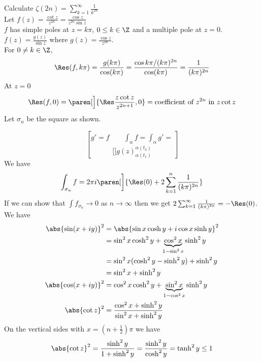 Calculate $\zeta(2n)=\sum_{k=1}^\infty\frac{1}{k^{2n}}$ \\
\soln Let $f(z)=\frac{\cot z}{z^{2n}}=\frac{\cos z}{z^{2n}\sin z}$ \\
$f$ has simple poles at $z=k\pi$, $0\leq k\in\Z$ and a multiple pole at $z=0$. \\
$f(z)=\frac{g(z)}{\sin z}$ where $g(z)=\frac{\cos z}{z^{2n}}$. \\
For $0\neq k\in\Z$,
\[ \Res(f,k\pi) = \frac{g(k\pi)}{\cos(k\pi)} = \frac{\cos k\pi/(k\pi)^{2n}}{\cos(k\pi)} = \frac{1}{(k\pi)^{2n}} \]
At $z=0$
\[ \Res(f,0) = \paren[\Big]{\Res\frac{z\cot z}{z^{2n+1}},0} = \text{coefficient of $z^{2n}$ in $z\cot z$} \]
Let $\sigma_n$ be the square as shown.
\begin{center}
\end{center}
\[ g' = f \qquad \int_\alpha f = \int_\alpha g' = \brack[\big]{g(z)}_{\alpha(t_1)}^{\alpha(t_2)} \]
We have
\[ \int_{\sigma_n}f = 2\pi i\paren[\bigg]{\Res(0)+2\sum_{k=1}^n\frac{1}{(k\pi)^{2n}}} \]
If we can show that $\int f_{\sigma_n}\to0$ as $n\to\infty$ then we get $2\sum_{k=1}^\infty\frac{1}{(k\pi)^{2n}}=-\Res(0)$. \\
We have
\begin{align*}
\abs{\sin(x+iy)}^2 &= \abs{\sin x\cosh y+i\cos x\sinh y}^2 \\
&= \sin^2 x \cosh^2 y + \underbrace{\cos^2 x}_{1-\sin^2 x} \sinh^2 y \\
&= \sin^2 x (\cosh^2 y - \sinh^2 y) + \sinh^2 y \\
&= \sin^2 x + \sinh^2 y \\
\abs{\cos(x+iy)}^2 &= \cos^2 x \cosh^2 y + \underbrace{\sin^2 x}_{1-\cos^2 x}\sinh^2 y \\
\abs{\cot z}^2 &= \frac{\cos^2 x+\sinh^2 y}{\sin^2 x+\sinh^2 y}
\end{align*}
On the vertical sides with $x = (n+\tfrac12)\pi$ we have
\[ \abs{\cot z}^2 = \frac{\sinh^2 y}{1+\sinh^2 y} = \frac{\sinh^2 y}{\cosh^2 y} = \tanh^2 y \leq 1 \]
